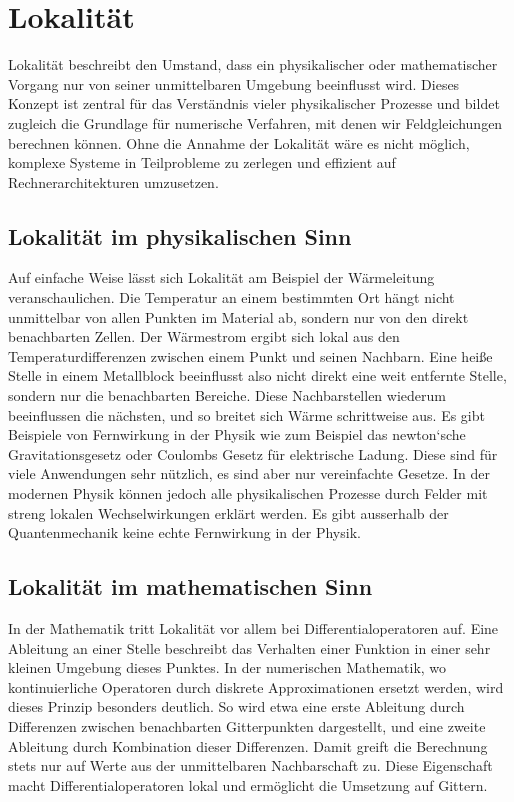 %
%
%
%
\section{Lokalität
\label{parallelisierung:sec:Lokalitaet}}
Lokalität beschreibt den Umstand, dass ein physikalischer oder mathematischer Vorgang nur von seiner unmittelbaren Umgebung beeinflusst wird. 
Dieses Konzept ist zentral für das Verständnis vieler physikalischer Prozesse und bildet zugleich die Grundlage für numerische Verfahren, mit denen wir Feldgleichungen berechnen können. 
Ohne die Annahme der Lokalität wäre es nicht möglich, komplexe Systeme in Teilprobleme zu zerlegen und effizient auf Rechnerarchitekturen umzusetzen.

\subsection{Lokalität im physikalischen Sinn
	\label{parallelisierung:sub:LokalitaetPhysik}}
Auf einfache Weise lässt sich Lokalität am Beispiel der Wärmeleitung veranschaulichen. 
Die Temperatur an einem bestimmten Ort hängt nicht unmittelbar von allen Punkten im Material ab, sondern nur von den direkt benachbarten Zellen. 
Der Wärmestrom ergibt sich lokal aus den Temperaturdifferenzen zwischen einem Punkt und seinen Nachbarn.
Eine heiße Stelle in einem Metallblock beeinflusst also nicht direkt eine weit entfernte Stelle, sondern nur die benachbarten Bereiche. 
Diese Nachbarstellen wiederum beeinflussen die nächsten, und so breitet sich Wärme schrittweise aus. 
Es gibt Beispiele von Fernwirkung in der Physik wie zum Beispiel das newton`sche Gravitationsgesetz oder Coulombs Gesetz für elektrische Ladung.
Diese sind für viele Anwendungen sehr nützlich, es sind aber nur vereinfachte Gesetze.
In der modernen Physik können jedoch alle physikalischen Prozesse durch Felder mit streng lokalen Wechselwirkungen erklärt werden.
Es gibt ausserhalb der Quantenmechanik keine echte Fernwirkung in der Physik.

\subsection{Lokalität im mathematischen Sinn
\label{parallelisierung:sub:LokalitaetMathematik}}
In der Mathematik tritt Lokalität vor allem bei Differentialoperatoren auf. 
Eine Ableitung an einer Stelle beschreibt das Verhalten einer Funktion in einer sehr kleinen Umgebung dieses Punktes. 
In der numerischen Mathematik, wo kontinuierliche Operatoren durch diskrete Approximationen ersetzt werden, wird dieses Prinzip besonders deutlich. 
So wird etwa eine erste Ableitung durch Differenzen zwischen benachbarten Gitterpunkten dargestellt, und eine zweite Ableitung durch Kombination dieser Differenzen. 
Damit greift die Berechnung stets nur auf Werte aus der unmittelbaren Nachbarschaft zu. 
Diese Eigenschaft macht Differentialoperatoren lokal und ermöglicht die Umsetzung auf Gittern.

